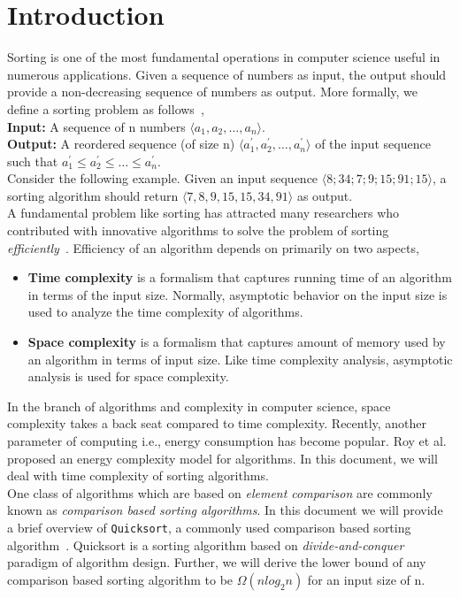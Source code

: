 \documentclass[a4paper, 10pt,twocolumn]{article}
\begin{document}
\section{Introduction}
Sorting is one of the most fundamental operations in computer science useful in numerous applications. Given a sequence of numbers as input, the output should provide a non-decreasing sequence of numbers as output. More formally, we define a sorting problem as follows~\cite{one},\\
\textbf{Input:} A sequence of n numbers $\langle a_1,a_2,\dots,a_n \rangle $.\\
\textbf{Output:} A reordered sequence (of size n) $\langle a_1^{'},a_2^{'},\dots,a_{n}^{'} \rangle$ of the input sequence such that $a_1^{'} \leq a_2^{'} \leq \dots \leq a_{n}^{'}.$\\
Consider the following example. Given an input sequence $\langle 8; 34; 7; 9; 15; 91; 15\rangle$, a sorting algorithm should return $\langle 7, 8, 9, 15, 15, 34, 91 \rangle$ as output.\\
A fundamental problem like sorting has attracted many researchers who contributed with innovative algorithms to solve the problem of sorting \textit{efficiently}~\cite{three}. Efficiency of an algorithm depends on primarily on two aspects,
\begin{itemize}
    \item \textbf{Time complexity} is a formalism that captures running time of an algorithm in terms of the input size. Normally, asymptotic behavior on the input size is used to analyze the time complexity of algorithms.
    \item \textbf{Space complexity} is a formalism that captures amount of memory used by an algorithm in terms of input size. Like time complexity analysis, asymptotic analysis is used for space complexity.
\end{itemize}
In the branch of algorithms and complexity in computer science, space complexity takes a back seat compared to time complexity. Recently, another parameter of computing i.e., energy consumption has become popular. Roy et al.~\cite{four} proposed an energy complexity model for algorithms. In this document, we will deal with time complexity of sorting algorithms.\\
One class of algorithms which are based on \textit{element comparison} are commonly known as \textit{comparison based sorting algorithms}. In this document we will provide a brief overview of \texttt{Quicksort}, a commonly used comparison based sorting algorithm~\cite{two}. Quicksort is a sorting algorithm based on \textit{divide-and-conquer} paradigm of algorithm design. Further, we will derive the lower bound of any comparison based sorting algorithm to be $\Omega(nlog_2 n)$ for an input size of n.
\end{document}
